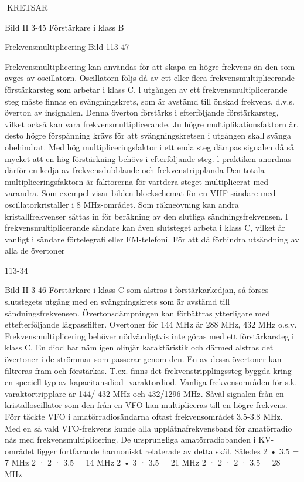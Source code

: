 KRETSAR

Bild II 3-45 Förstärkare i klass B

Frekvensmultiplicering
Bild 113-47

Frekvensmultiplicering kan användas för att
skapa en högre frekvens än den som avges
av oscillatorn. Oscillatorn följs då av ett eller
flera frekvensmultiplicerande förstärkarsteg
som arbetar i klass C.
l utgången av ett frekvensmultiplicerande steg måste finnas en svängningskrets,
som är avstämd till önskad frekvens, d.v.s.
överton av insignalen. Denna överton förstärks i efterföljande förstärkarsteg, vilket
också kan vara frekvensmultiplicerande.
Ju högre multiplikationsfaktorn är, desto
högre förspänning krävs för att svängningskretsen i utgången skall svänga obehindrat.
Med hög multipliceringsfaktor i ett enda steg
dämpas signalen då så mycket att en hög
förstärkning behövs i efterföljande steg. l
praktiken anordnas därför en kedja av frekvensdubblande och frekvenstripplanda
Den totala multipliceringsfaktorn är faktorerna för vartdera steget multiplicerat med varandra.
Som exempel visar bilden blockschemat
för en VHF-sändare med oscillatorkristaller i
8 MHz-området. Som räkneövning kan andra kristallfrekvenser sättas in för beräkning
av den slutliga sändningsfrekvensen. l frekvensmultiplicerande sändare kan även slutsteget arbeta i klass C, vilket är vanligt i
sändare förtelegrafi eller FM-telefoni. För att
då förhindra utsändning av alla de övertoner

113-34

Bild II 3-46 Förstärkare i klass C
som alstras i förstärkarkedjan, så förses
slutstegets utgång med en svängningskrets
som är avstämd till sändningsfrekvensen.
Övertonsdämpningen kan förbättras ytterligare med ettefterföljande lågpassfilter. Overtoner för 144 MHz är 288 MHz, 432 MHz
o.s.v.
Frekvensmultiplicering behöver nödvändigtvis inte göras med ett förstärkarsteg i
klass C. En diod har nämligen olinjär karaktäristik och därmed alstras det övertoner i de
strömmar som passerar genom den. En av
dessa övertoner kan filtreras fram och förstärkas. T.ex. finns det frekvenstripplingssteg byggda kring en speciell typ av kapacitansdiod- varaktordiod. Vanliga frekvensområden för s.k. varaktortripplare är 144/
432 MHz och 432/1296 MHz.
Såväl signalen från en kristalloscillator
som den från en VFO kan multipliceras till en
högre frekvens.
Förr täckte VFO i amatörradiosändarna
oftast frekvensområdet 3.5-3.8 MHz. Med
en så vald VFO-frekvens kunde alla upplåtnafrekvensband för amatörradio nås med
frekvensmultiplicering. De ursprungliga amatörradiobanden i KV-området ligger fortfarande harmoniskt relaterade av detta skäl.
Således
2 • 3.5 = 7 MHz
2 · 2 · 3.5 = 14 MHz
2 • 3 · 3.5 = 21 MHz
2 · 2 · 2 · 3.5 = 28 MHz

